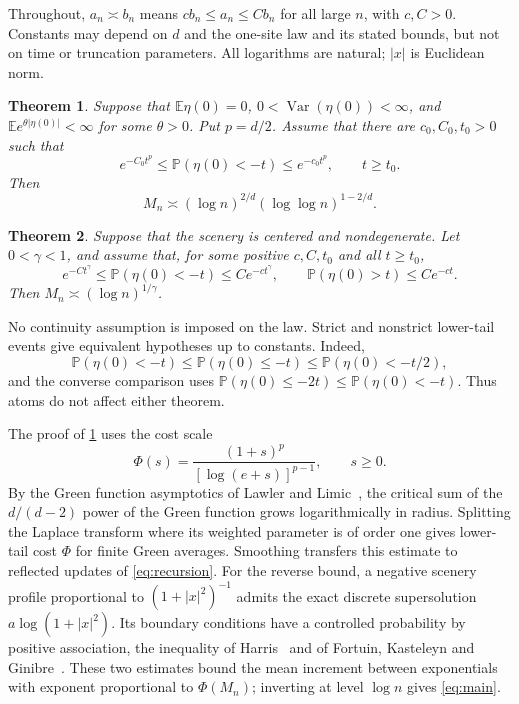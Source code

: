 \documentclass[11pt]{amsart}
\newtheorem{theorem}{Theorem}[section]
\theoremstyle{remark}
\newcommand{\Pp}{\mathbb P}
\newcommand{\E}{\mathbb E}
\DeclareMathOperator{\Var}{Var}
\begin{document}
Throughout, $a_n\asymp b_n$ means $cb_n\le a_n\le Cb_n$ for all large
$n$, with $c,C>0$. Constants may depend on $d$ and the one-site law and
its stated bounds, but not on time or truncation parameters.
All logarithms are natural; $|x|$ is Euclidean norm.

\begin{samepage}
\begin{theorem}\label{thm:main}
Suppose that $\E\eta(0)=0$, $0<\Var(\eta(0))<\infty$, and
$\E e^{\theta|\eta(0)|}<\infty$ for some $\theta>0$.
Put $p=d/2$. Assume that there are $c_0,C_0,t_0>0$ such that
\begin{equation}\label{eq:criticaltail}
 e^{-C_0t^p}\le\Pp(\eta(0)<-t)\le e^{-c_0t^p},
 \qquad t\ge t_0.
\end{equation}
Then
\begin{equation}\label{eq:main}
 M_n\asymp(\log n)^{2/d}(\log\log n)^{1-2/d}.
\end{equation}
\end{theorem}
\end{samepage}

\begin{theorem}\label{thm:heavy}
Suppose that the scenery is centered and nondegenerate. Let $0<\gamma<1$,
and assume that, for some positive $c,C,t_0$ and all $t\ge t_0$,
\begin{equation}\label{eq:heavytail}
 e^{-Ct^\gamma}\le\Pp(\eta(0)<-t)\le C e^{-ct^\gamma},
 \qquad \Pp(\eta(0)>t)\le C e^{-ct}.
\end{equation}
Then $M_n\asymp(\log n)^{1/\gamma}$.
\end{theorem}

No continuity assumption is imposed on the law. Strict and nonstrict
lower-tail events give equivalent hypotheses up to constants. Indeed,
\[
 \Pp(\eta(0)<-t)\le\Pp(\eta(0)\le-t)
 \le\Pp(\eta(0)<-t/2),
\]
and the converse comparison uses
$\Pp(\eta(0)\le-2t)\le\Pp(\eta(0)<-t)$.
Thus atoms do not affect either theorem.

The proof of \cref{thm:main} uses the cost scale
\begin{equation}\label{eq:phi}
 \Phi(s)=\frac{(1+s)^p}{[\log(e+s)]^{p-1}},\qquad s\ge0.
\end{equation}
By the Green function asymptotics of Lawler and Limic~\cite{LL}, the
critical sum of the $d/(d-2)$ power of the Green function grows
logarithmically in radius. Splitting the Laplace transform where its
weighted parameter is of order one gives lower-tail cost $\Phi$ for
finite Green averages. Smoothing transfers this estimate to reflected
updates of \eqref{eq:recursion}. For the reverse bound, a negative scenery
profile proportional to $(1+|x|^2)^{-1}$ admits the exact discrete
supersolution $a\log(1+|x|^2)$. Its boundary conditions have a controlled
probability by positive association, the inequality of
Harris~\cite{Harris} and of Fortuin, Kasteleyn and Ginibre~\cite{FKG}.
These two estimates bound the mean
increment between exponentials with exponent proportional to $\Phi(M_n)$;
inverting at level $\log n$ gives \eqref{eq:main}.
\end{document}

